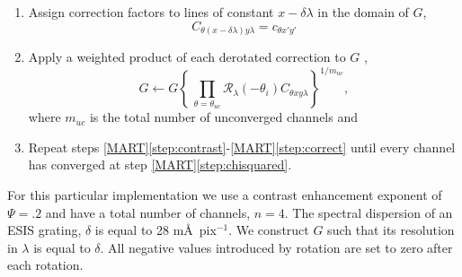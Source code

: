 \begin{enumerate}
		\item Assign correction factors to lines of constant $x-\delta\lambda$ in the domain of $G$,
			\begin{equation}
				C_{\theta (x-\delta\lambda)y\lambda} = c_{\theta x'y'}
			\end{equation}	
		
		\item \label{step:correct} Apply a weighted product of each derotated correction to $G$ ,
			\begin{equation}\label{eq:correct}
				G \leftarrow G\left\lbrace  \,\prod_{\theta=\theta_{uc}}  \mathcal{R}_\lambda(-\theta_i)C_{\theta xy\lambda} \right\rbrace^{1/m_{uc}},
			\end{equation}
		where $m_{uc}$ is the total number of unconverged channels and 
		
		\item Repeat steps \ref{MART}\ref{step:contrast}-\ref{MART}\ref{step:correct}
		until every channel has converged at step \ref{MART}\ref{step:chisquared}.
	\end{enumerate}
		For this particular implementation we use a contrast enhancement exponent of $\Psi = .2$ and have a total number of channels, $n=4$.
		The spectral dispersion of an ESIS grating, $\delta$ is equal to 28 m\AA\ pix$^{-1}$. 
		We construct $G$ such that its resolution  in $\lambda$ is equal to $\delta$.
		All negative values introduced by rotation are set to zero after each rotation.

